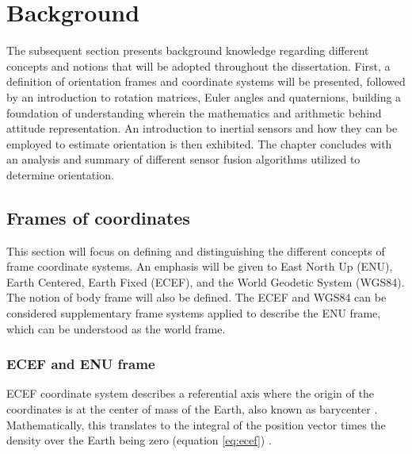 
\section{Background}

The subsequent section presents background knowledge regarding different concepts and notions that will be adopted throughout the dissertation.
First, a definition of orientation frames and coordinate systems will be presented, followed by an introduction to rotation matrices, Euler angles and quaternions, building a foundation of understanding wherein the mathematics and arithmetic behind attitude representation. An introduction to inertial sensors and how they can be employed to estimate orientation is then exhibited. The chapter concludes with an analysis and summary of different sensor fusion algorithms utilized to determine orientation.

\subsection{Frames of coordinates}

This section will focus on defining and distinguishing the different concepts of frame coordinate systems. An emphasis will be given to East North Up (ENU), Earth Centered, Earth Fixed (ECEF), and the World Geodetic System (WGS84). The notion of body frame will also be defined. The ECEF and WGS84 can be considered supplementary frame systems applied to describe the ENU frame, which can be understood as the world frame.

\subsubsection{ECEF and ENU frame}

ECEF coordinate system describes a referential axis where the origin of the coordinates is at the center of mass of the Earth, also known as barycenter \cite{cai2011coordinate}. Mathematically, this translates to the integral of the position vector times the density over the Earth being zero (equation \ref{eq:ecef}) \cite{laundal2017magnetic}.

